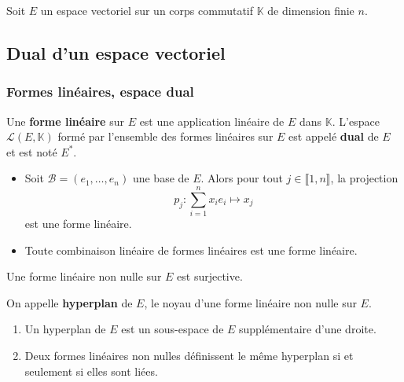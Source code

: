 




  Soit $E$ un espace vectoriel sur un corps commutatif $\mathbb{K}$ de dimension finie $n$.

  \subsection{Dual d'un espace vectoriel}

  \subsubsection{Formes linéaires, espace dual}


  \begin{definition}
    Une \textbf{forme linéaire} sur $E$ est une application linéaire de $E$ dans $\mathbb{K}$. L'espace $\mathcal{L}(E, \mathbb{K})$ formé par l'ensemble des formes linéaires sur $E$ est appelé \textbf{dual} de $E$ et est noté $E^*$.
  \end{definition}

  \begin{example}
    \label{159-1}
    \begin{itemize}
      \item Soit $\mathcal{B} = (e_1, \dots, e_n)$ une base de $E$. Alors pour tout $j \in \llbracket 1, n \rrbracket$, la projection
      \[ p_j : \sum_{i=1}^{n} x_i e_i \mapsto x_j \]
      est une forme linéaire.
      \item Toute combinaison linéaire de formes linéaires est une forme linéaire.
    \end{itemize}
  \end{example}

  \begin{remark}
    Une forme linéaire non nulle sur $E$ est surjective.
  \end{remark}

  \begin{definition}
    On appelle \textbf{hyperplan} de $E$, le noyau d'une forme linéaire non nulle sur $E$.
  \end{definition}

  \begin{proposition}
    \begin{enumerate}[label={\bfseries(\roman*)}]
      \item Un hyperplan de $E$ est un sous-espace de $E$ supplémentaire d'une droite.
      \item Deux formes linéaires non nulles définissent le même hyperplan si et seulement si elles sont liées.
    \end{enumerate}
  \end{proposition}

